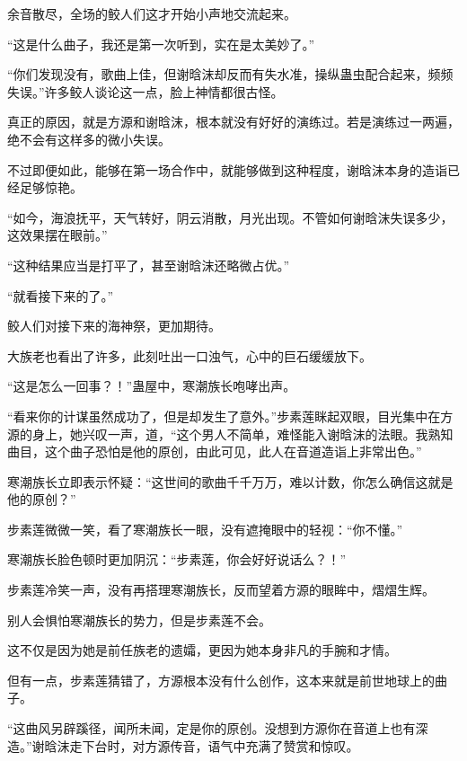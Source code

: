 
\begin{this_body}



余音散尽，全场的鲛人们这才开始小声地交流起来。

“这是什么曲子，我还是第一次听到，实在是太美妙了。”

“你们发现没有，歌曲上佳，但谢晗沫却反而有失水准，操纵蛊虫配合起来，频频失误。”许多鲛人谈论这一点，脸上神情都很古怪。

真正的原因，就是方源和谢晗沫，根本就没有好好的演练过。若是演练过一两遍，绝不会有这样多的微小失误。

不过即便如此，能够在第一场合作中，就能够做到这种程度，谢晗沫本身的造诣已经足够惊艳。

“如今，海浪抚平，天气转好，阴云消散，月光出现。不管如何谢晗沫失误多少，这效果摆在眼前。”

“这种结果应当是打平了，甚至谢晗沫还略微占优。”

“就看接下来的了。”

鲛人们对接下来的海神祭，更加期待。

大族老也看出了许多，此刻吐出一口浊气，心中的巨石缓缓放下。

“这是怎么一回事？！”蛊屋中，寒潮族长咆哮出声。

“看来你的计谋虽然成功了，但是却发生了意外。”步素莲眯起双眼，目光集中在方源的身上，她兴叹一声，道，“这个男人不简单，难怪能入谢晗沫的法眼。我熟知曲目，这个曲子恐怕是他的原创，由此可见，此人在音道造诣上非常出色。”

寒潮族长立即表示怀疑：“这世间的歌曲千千万万，难以计数，你怎么确信这就是他的原创？”

步素莲微微一笑，看了寒潮族长一眼，没有遮掩眼中的轻视：“你不懂。”

寒潮族长脸色顿时更加阴沉：“步素莲，你会好好说话么？！”

步素莲冷笑一声，没有再搭理寒潮族长，反而望着方源的眼眸中，熠熠生辉。

别人会惧怕寒潮族长的势力，但是步素莲不会。

这不仅是因为她是前任族老的遗孀，更因为她本身非凡的手腕和才情。

但有一点，步素莲猜错了，方源根本没有什么创作，这本来就是前世地球上的曲子。

“这曲风另辟蹊径，闻所未闻，定是你的原创。没想到方源你在音道上也有深造。”谢晗沫走下台时，对方源传音，语气中充满了赞赏和惊叹。


\end{this_body}
